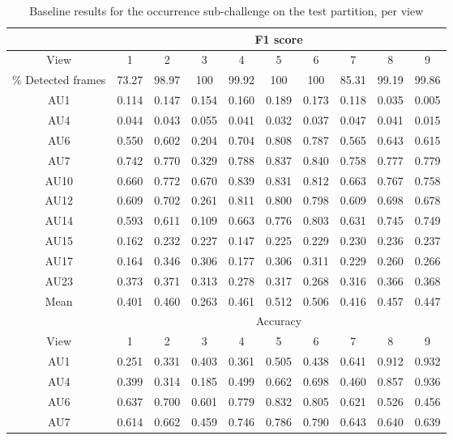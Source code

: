 \documentclass[a4paper, 10pt, conference]{ieeeconf}      \usepackage{FG2017}
\begin{document}
\begin{table*}[t]
\begin{center}
\caption{Baseline results for the occurrence sub-challenge on the test partition, per view}
\vspace{2mm}
\label{t:baseline_occurrence_per_view_test}
\begin{tabular}{c|c|c|c|c|c|c|c|c|c|}
\hhline{----------} 
& \multicolumn{9}{c|}{F1 score} \\
\hline
View & 1 & 2 & 3 & 4 & 5 & 6 & 7 & 8 & 9 \\
\hline
\% Detected frames & 73.27 &  98.97 & 100 & 99.92 & 100 & 100 & 85.31 & 99.19 & 99.86 \\
\hline
AU1 & 0.114 & 0.147 & 0.154 & 0.160 & 0.189 & 0.173 & 0.118 & 0.035 & 0.005 \\ 
AU4 & 0.044 & 0.043 & 0.055 & 0.041 & 0.032 & 0.037 & 0.047 & 0.041 & 0.015 \\ 
AU6 & 0.550 & 0.602 & 0.204 & 0.704 & 0.808 & 0.787 & 0.565 & 0.643 & 0.615 \\ 
AU7 & 0.742 & 0.770 & 0.329 & 0.788 & 0.837 & 0.840 & 0.758 & 0.777 & 0.779 \\ 
AU10 & 0.660 & 0.772 & 0.670 & 0.839 & 0.831 & 0.812 & 0.663 & 0.767 & 0.758 \\ 
AU12 & 0.609 & 0.702 & 0.261 & 0.811 & 0.800 & 0.798 & 0.609 & 0.698 & 0.678 \\ 
AU14 & 0.593 & 0.611 & 0.109 & 0.663 & 0.776 & 0.803 & 0.631 & 0.745 & 0.749 \\ 
AU15 & 0.162 & 0.232 & 0.227 & 0.147 & 0.225 & 0.229 & 0.230 & 0.236 & 0.237 \\ 
AU17 & 0.164 & 0.346 & 0.306 & 0.177 & 0.306 & 0.311 & 0.229 & 0.260 & 0.266 \\ 
AU23 & 0.373 & 0.371 & 0.313 & 0.278 & 0.317 & 0.268 & 0.316 & 0.366 & 0.368 \\ 
\hline
Mean & 0.401 & 0.460 & 0.263 & 0.461 & 0.512 & 0.506 & 0.416 & 0.457 & 0.447 
 \\ \hline
& \multicolumn{9}{c|}{Accuracy} \\
\hline
View & 1 & 2 & 3 & 4 & 5 & 6 & 7 & 8 & 9 \\
\hline
AU1 & 0.251 & 0.331 & 0.403 & 0.361 & 0.505 & 0.438 & 0.641 & 0.912 & 0.932 \\ 
AU4 & 0.399 & 0.314 & 0.185 & 0.499 & 0.662 & 0.698 & 0.460 & 0.857 & 0.936 \\ 
AU6 & 0.637 & 0.700 & 0.601 & 0.779 & 0.832 & 0.805 & 0.621 & 0.526 & 0.456 \\ 
AU7 & 0.614 & 0.662 & 0.459 & 0.746 & 0.786 & 0.790 & 0.643 & 0.640 & 0.639 \\ 

\end{tabular}
\end{center}
\end{table*}
\end{document}
